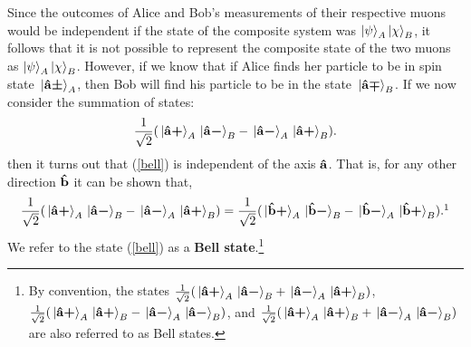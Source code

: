 Since the outcomes of Alice and Bob's measurements of their respective muons would be independent if the state of the composite system was $\ket{\psi}_A\ket{\chi}_B$, it follows that it is not possible to represent the composite state of the two muons as $\ket{\psi}_A\ket{\chi}_B$. However, if we know that if Alice finds her particle to be in spin state $\ket*{\vb{\hat{{a}}}\bm{\pm}}_A$, then Bob will find his particle to be in the state $\ket*{\vb{\hat{{a}}}\bm{\mp}}_B$. If we now consider the summation of states:
\begin{equation}\label{bell}
    \frac{1}{\sqrt{2}}(\ket*{\vb{\hat{{a}}}\bm{+}}_A\ket*{\vb{\hat{{a}}}\bm{-}}_B-\ket*{\vb{\hat{{a}}}\bm{-}}_A\ket*{\vb{\hat{{a}}}\bm{+}}_B).
\end{equation}
then it turns out that (\ref{bell}) is independent of the axis $\vb{\hat{{a}}}$. That is, for any other direction $\vb{\hat{{b}}}$ it can be shown that,
\begin{equation}\label{bellstate2}\frac{1}{\sqrt{2}}(\ket*{\uvbp{a}}_A\ket*{\uvbm{a}}_B-\ket*{\uvbm{a}}_A\ket*{\uvbp{a}}_B)=\frac{1}{\sqrt{2}}(\ket*{\uvbp{b}}_A\ket*{\uvbm{b}}_B-\ket*{\uvbm{b}}_A\ket*{\uvbp{b}}_B).\protect\footnotemark\end{equation}
We refer to the state (\ref{bell}) as a \textbf{Bell state}.\footnote{By convention, the states $ \frac{1}{\sqrt{2}}(\ket*{\vb{\hat{{a}}}\bm{+}}_A\ket*{\vb{\hat{{a}}}\bm{-}}_B+\ket*{\vb{\hat{{a}}}\bm{-}}_A\ket*{\vb{\hat{{a}}}\bm{+}}_B)$, $ \frac{1}{\sqrt{2}}(\ket*{\vb{\hat{{a}}}\bm{+}}_A\ket*{\vb{\hat{{a}}}\bm{+}}_B-\ket*{\vb{\hat{{a}}}\bm{-}}_A\ket*{\vb{\hat{{a}}}\bm{-}}_B)$, and $ \frac{1}{\sqrt{2}}(\ket*{\vb{\hat{{a}}}\bm{+}}_A\ket*{\vb{\hat{{a}}}\bm{+}}_B+\ket*{\vb{\hat{{a}}}\bm{-}}_A\ket*{\vb{\hat{{a}}}\bm{-}}_B)$ are also referred to as Bell states.}

